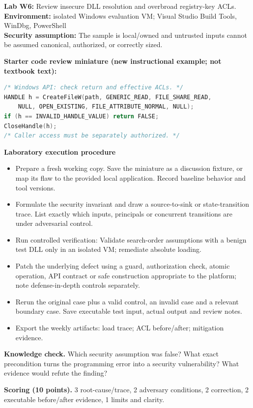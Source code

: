 \documentclass[10pt,letterpaper]{article}
\begin{document}
\begin{insight}\textbf{Lab W6:} Review insecure DLL resolution and overbroad registry-key ACLs.\\\textbf{Environment:} isolated Windows evaluation VM; Visual Studio Build Tools, WinDbg, PowerShell\\\textbf{Security assumption:} The sample is local/owned and untrusted inputs cannot be assumed canonical, authorized, or correctly sized.\end{insight}
\textbf{Starter code review miniature (new instructional example; not textbook text):}
\begin{lstlisting}[language=C]
/* Windows API: check return and effective ACLs. */
HANDLE h = CreateFileW(path, GENERIC_READ, FILE_SHARE_READ,
    NULL, OPEN_EXISTING, FILE_ATTRIBUTE_NORMAL, NULL);
if (h == INVALID_HANDLE_VALUE) return FALSE;
CloseHandle(h);
/* Caller access must be separately authorized. */
\end{lstlisting}
\textbf{Laboratory execution procedure}
\begin{itemize}[leftmargin=*,itemsep=2pt]
\item Prepare a fresh working copy. Save the miniature as a discussion fixture, or map its flaw to the provided local application. Record baseline behavior and tool versions.
\item Formulate the security invariant and draw a source-to-sink or state-transition trace. List exactly which inputs, principals or concurrent transitions are under adversarial control.
\item Run controlled verification: Validate search-order assumptions with a benign test DLL only in an isolated VM; remediate absolute loading.
\item Patch the underlying defect using a guard, authorization check, atomic operation, API contract or safe construction appropriate to the platform; note defense-in-depth controls separately.
\item Rerun the original case plus a valid control, an invalid case and a relevant boundary case. Save executable test input, actual output and review notes.
\item Export the weekly artifacts: load trace; ACL before/after; mitigation evidence.
\end{itemize}
\textbf{Knowledge check.} Which security assumption was false? What exact precondition turns the programming error into a security vulnerability? What evidence would refute the finding?

\textbf{Scoring (10 points).} 3 root-cause/trace, 2 adversary conditions, 2 correction, 2 executable before/after evidence, 1 limits and clarity.
\end{document}
